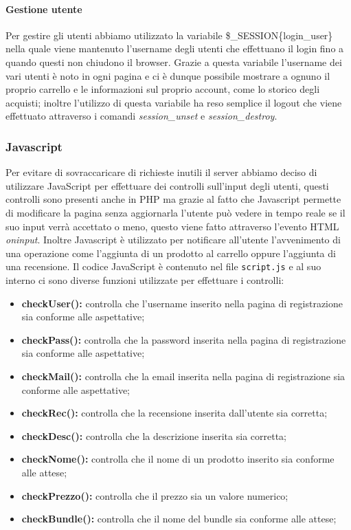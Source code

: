 \paragraph{Gestione utente} \Spazio
Per gestire gli utenti abbiamo utilizzato la variabile \$\_SESSION\{login\_user\} nella quale viene mantenuto l'username degli utenti che effettuano il login fino a quando questi non chiudono il browser.\newline
Grazie a questa variabile l'username dei vari utenti è noto in ogni pagina e ci è dunque possibile mostrare a ognuno il proprio carrello e le informazioni sul proprio account, come lo storico degli acquisti;
inoltre l'utilizzo di questa variabile ha reso semplice il logout che viene effettuato attraverso i comandi \emph{session\_unset} e \emph{session\_destroy}.

\subsubsection{Javascript}
Per evitare di sovraccaricare di richieste inutili il server abbiamo deciso di utilizzare JavaScript per effettuare dei controlli sull'input degli utenti, questi controlli sono presenti anche in PHP ma grazie al fatto che Javascript permette di modificare la pagina senza aggiornarla l'utente può vedere in tempo reale se il suo input verrà accettato o meno, questo viene fatto attraverso l'evento HTML \emph{oninput}.\newline
Inoltre Javascript è utilizzato per notificare all'utente l'avvenimento di una operazione come l'aggiunta di un prodotto al carrello oppure l'aggiunta di una recensione.\newline
Il codice JavaScript è contenuto nel file \texttt{script.js} e al suo interno ci sono diverse funzioni utilizzate per effettuare i controlli:
\begin{itemize}
	\item \textbf{checkUser():} controlla che l'username inserito nella pagina di registrazione sia conforme alle aspettative;
	\item \textbf{checkPass():} controlla che la password inserita nella pagina di registrazione sia conforme alle aspettative;
	\item \textbf{checkMail():} controlla che la email inserita nella pagina di registrazione sia conforme alle aspettative;
	\item \textbf{checkRec():} controlla che la recensione inserita dall'utente sia corretta;
	\item \textbf{checkDesc():} controlla che la descrizione inserita sia corretta;
	\item \textbf{checkNome():} controlla che il nome di un prodotto inserito sia conforme alle attese;
	\item \textbf{checkPrezzo():} controlla che il prezzo sia un valore numerico;
	\item \textbf{checkBundle():} controlla che il nome del bundle sia conforme alle attese;
\end{itemize}

